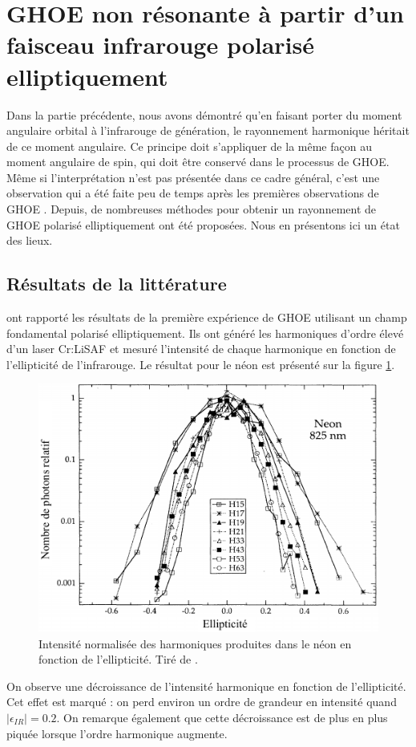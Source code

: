 \section{GHOE non résonante à partir d'un faisceau infrarouge polarisé elliptiquement}
\label{sec:ghoepolar}
Dans la partie précédente, nous avons démontré qu'en faisant porter du moment angulaire orbital à l'infrarouge de génération, le rayonnement harmonique héritait de ce moment angulaire. Ce principe doit s'appliquer de la même façon au moment angulaire de spin, qui doit être conservé dans le processus de GHOE. Même si l'interprétation n'est pas présentée dans ce cadre général, c'est une observation qui a été faite peu de temps après les premières observations de GHOE . Depuis, de nombreuses méthodes pour obtenir un rayonnement de GHOE polarisé elliptiquement ont été proposées. Nous en présentons ici un état des lieux. 

\subsection{Résultats de la littérature}
 ont rapporté les résultats de la première expérience de GHOE utilisant un champ fondamental polarisé elliptiquement. Ils ont généré les harmoniques d'ordre élevé d'un laser \shorthandoff{:} Cr:LiSAF \shorthandon{:} et mesuré l'intensité de chaque harmonique en fonction de l'ellipticité de l'infrarouge. Le résultat pour le néon est présenté sur la figure \ref{Fig:budil}.
\begin{figure}[!ht]
\centering
\includegraphics[width=0.6\columnwidth]{Figures/Polar/Intensity_f_ellipticity_budil}%
\caption{Intensité normalisée des harmoniques produites dans le néon en fonction de l'ellipticité. Tiré de .}%
\label{Fig:budil}%
\end{figure}

On observe une décroissance de l'intensité harmonique en fonction de l'ellipticité. Cet effet est marqué : on perd environ un ordre de grandeur en intensité quand $|\epsilon_{IR}| = 0.2$. On remarque également que cette décroissance est de plus en plus piquée lorsque l'ordre harmonique augmente.

